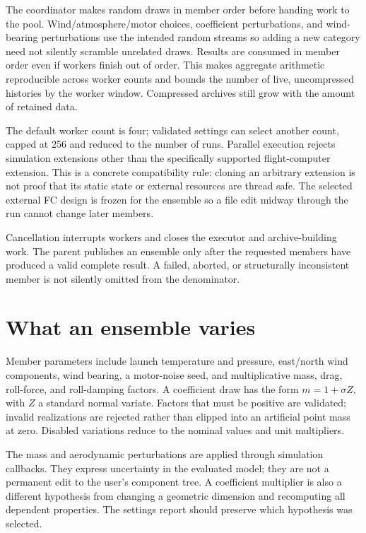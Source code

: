 The coordinator makes random draws in member order before handing work to the pool. Wind/atmosphere/motor choices, coefficient perturbations, and wind-bearing perturbations use the intended random streams so adding a new category need not silently scramble unrelated draws. Results are consumed in member order even if workers finish out of order. This makes aggregate arithmetic reproducible across worker counts and bounds the number of live, uncompressed histories by the worker window. Compressed archives still grow with the amount of retained data.

The default worker count is four; validated settings can select another count, capped at 256 and reduced to the number of runs. Parallel execution rejects simulation extensions other than the specifically supported flight-computer extension. This is a concrete compatibility rule: cloning an arbitrary extension is not proof that its static state or external resources are thread safe. The selected external FC design is frozen for the ensemble so a file edit midway through the run cannot change later members.

Cancellation interrupts workers and closes the executor and archive-building work. The parent publishes an ensemble only after the requested members have produced a valid complete result. A failed, aborted, or structurally inconsistent member is not silently omitted from the denominator.

\section{What an ensemble varies}
Member parameters include launch temperature and pressure, east/north wind components, wind bearing, a motor-noise seed, and multiplicative mass, drag, roll-force, and roll-damping factors. A coefficient draw has the form $m=1+\sigma Z$, with $Z$ a standard normal variate. Factors that must be positive are validated; invalid realizations are rejected rather than clipped into an artificial point mass at zero. Disabled variations reduce to the nominal values and unit multipliers.

The mass and aerodynamic perturbations are applied through simulation callbacks. They express uncertainty in the evaluated model; they are not a permanent edit to the user's component tree. A coefficient multiplier is also a different hypothesis from changing a geometric dimension and recomputing all dependent properties. The settings report should preserve which hypothesis was selected.

